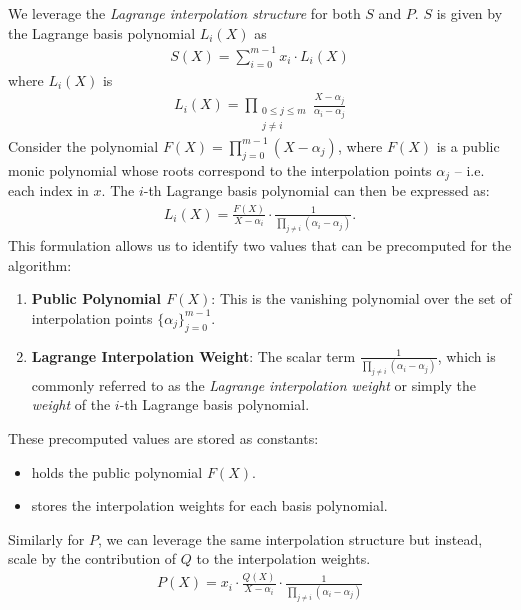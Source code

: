 \documentclass[11pt]{report}
\theoremstyle{definition}
\theoremstyle{plain}
\begin{document}
We leverage the \textit{Lagrange interpolation structure} for both $S$ and $P$. $S$ is given by the Lagrange basis polynomial $L_i(X)$ as
\begin{align*}
  S(X) = \sum_{i=0}^{m-1} x_i \cdot L_i(X)
\end{align*}
where $L_i(X)$ is
\begin{align*}
  L_i(X) = \prod_{\substack{0\leq j\leq m \\ j\neq i}} \frac{X-\alpha_j}{\alpha_i-\alpha_j}
\end{align*}
Consider the polynomial $F(X) = \prod_{j=0}^{m-1} (X - \alpha_j)$, where $F(X)$ is a public monic polynomial whose roots correspond to the interpolation points $\alpha_j$ -- i.e. each index in $x$. The $i$-th Lagrange basis polynomial can then be expressed as:
\begin{align*}
  L_i(X) = \frac{F(X)}{X - \alpha_i} \cdot \frac{1}{\prod_{j \neq i} (\alpha_i - \alpha_j)}.
\end{align*}
This formulation allows us to identify two values that can be precomputed for the algorithm:

\begin{enumerate}
  \item \textbf{Public Polynomial $F(X)$}: This is the vanishing polynomial over the set of interpolation points $\{\alpha_j\}_{j=0}^{m-1}$.
  \item \textbf{Lagrange Interpolation Weight}: The scalar term $\frac{1}{\prod_{j \neq i} (\alpha_i - \alpha_j)}$, which is commonly referred to as the \textit{Lagrange interpolation weight} or simply the \textit{weight} of the $i$-th Lagrange basis polynomial.
\end{enumerate}

These precomputed values are stored as constants:
\begin{itemize}
  \item {} holds the public polynomial $F(X)$.
  \item {} stores the interpolation weights for each basis polynomial.
\end{itemize}

Similarly for $P$, we can leverage the same interpolation structure but instead, scale by the contribution of $Q$ to the interpolation weights.
\begin{align*}
  P(X) = x_i \cdot \frac{Q(X)}{X - \alpha_i} \cdot \frac{1}{\prod_{j\neq i}(\alpha_i - \alpha_j)}
\end{align*}
\end{document}
